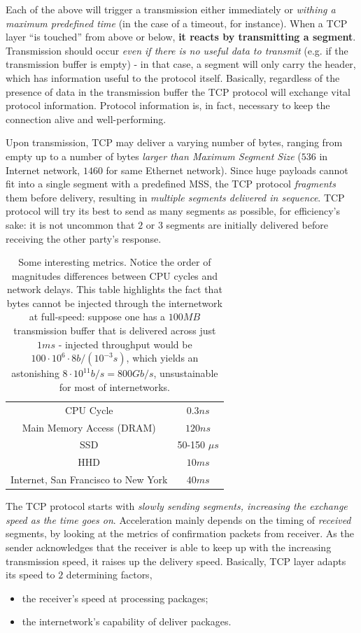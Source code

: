 \documentclass[10pt]{book}
\begin{document}
Each of the above will trigger a transmission either immediately or
\emph{withing a maximum predefined time} (in the case of a timeout, for
instance). When a TCP layer ``is touched'' from above or below, \textbf{it reacts
by transmitting a segment}. Transmission should occur \emph{even if there is no
useful data to transmit} (e.g. if the transmission buffer is empty) \-- in that
case, a segment will only carry the header, which has information useful to the
protocol itself. Basically, regardless of the presence of data in the
transmission buffer the TCP protocol will exchange vital protocol information.
Protocol information is, in fact, necessary to keep the connection alive and
well-performing.

Upon transmission, TCP may deliver a varying number of bytes, ranging from
empty up to a number of bytes \emph{larger than Maximum Segment Size} ($536$ in
Internet network, $1460$ for same Ethernet network). Since huge payloads cannot
fit into a single segment with a predefined MSS, the TCP protocol
\emph{fragments} them before delivery, resulting in \emph{multiple segments
delivered in sequence}. TCP protocol will try its best to send as many segments
as possible, for efficiency's sake: it is not uncommon that $2$ or $3$ segments
are initially delivered before receiving the other party's response.

\begin{table}[ht]
\centering
\begin{tabular}{cc}
CPU Cycle & $0.3 ns$ \\
Main Memory Access (DRAM) & $120ns$ \\
SSD & 50-150 $\mu s$ \\
HHD & $10 ms$ \\
Internet, San Francisco to New York & $40ms$
\end{tabular}
\caption{Some interesting metrics. Notice the order of magnitudes differences
between CPU cycles and network delays. This table highlights the fact that
bytes cannot be injected through the internetwork at full\--speed: suppose one
has a $100MB$ transmission buffer that is delivered across just $1ms$ \--
injected throughput would be $100 \cdot 10^6 \cdot 8 b/(10^{-3} s)$, which
yields an astonishing $8 \cdot 10^{11} b/s = 800 Gb/s$, unsustainable for most
of internetworks.}
\label{tab:SomeMetrics}
\end{table}
\bigskip

The TCP protocol starts with \emph{slowly sending segments, increasing the exchange
speed as the time goes on}. Acceleration mainly depends on the timing of
\emph{received} segments, by looking at the metrics of confirmation packets
from receiver. As the sender acknowledges that the receiver is able to keep up
with the increasing transmission speed, it raises up the delivery speed. Basically, TCP layer adapts its speed to $2$ determining factors,
\begin{itemize}
    \item the receiver's speed at processing packages;
    \item the internetwork's capability of deliver packages.
\end{itemize}
\end{document}
